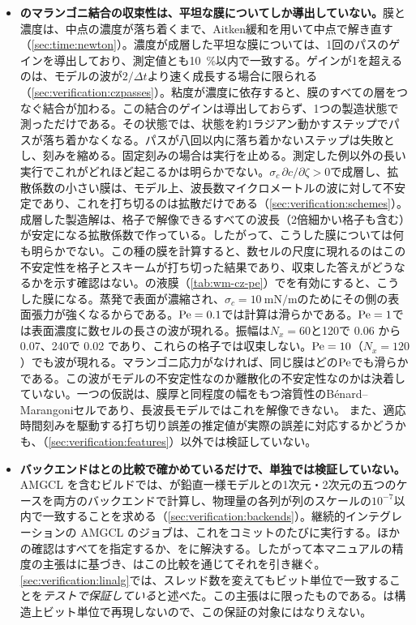 \begin{itemize}
  \item \textbf{のマランゴニ結合の収束性は、平坦な膜についてしか導出していない。}膜と濃度は、中点の濃度が落ち着くまで、Aitken緩和を用いて中点で解き直す（\cref{sec:time:newton}）。濃度が成層した平坦な膜については、1回のパスのゲインを導出しており、測定値とも\SI{10}{\percent}以内で一致する。ゲインが1を超えるのは、モデルの波が$2/\Delta t$より速く成長する場合に限られる（\cref{sec:verification:czpasses}）。粘度が濃度に依存すると、膜のすべての層をつなぐ結合が加わる。この結合のゲインは導出しておらず、1つの製造状態で測っただけである。その状態では、状態を約1ラジアン動かすステップでパスが落ち着かなくなる。パスが八回以内に落ち着かないステップは失敗とし、刻みを縮める。固定刻みの場合は実行を止める。測定した例以外の長い実行でこれがどれほど起こるかは明らかでない。$\sigma_c\,\partial c/\partial\zeta > 0$で成層し、拡散係数の小さい膜は、モデル上、波長数マイクロメートルの波に対して不安定であり、これを打ち切るのは拡散だけである（\cref{sec:verification:schemes}）。成層した製造解は、格子で解像できるすべての波長（2倍細かい格子も含む）が安定になる拡散係数で作っている。したがって、こうした膜については何も明らかでない。この種の膜を計算すると、数セルの尺度に現れるのはこの不安定性を格子とスキームが打ち切った結果であり、収束した答えがどうなるかを示す確認はない。の液膜（\cref{tab:wm-cz-pe}）でを有効にすると、こうした膜になる。蒸発で表面が濃縮され、$\sigma_c = \SI{10}{\milli\newton\per\metre}$のためにその側の表面張力が強くなるからである。$\mathrm{Pe} = 0.1$では計算は滑らかである。$\mathrm{Pe} = 1$では表面濃度に数セルの長さの波が現れる。振幅は$N_x = 60$と120で 0.06 から 0.07、240で 0.02 であり、これらの格子では収束しない。$\mathrm{Pe} = 10$（$N_x = 120$）でも波が現れる。マランゴニ応力がなければ、同じ膜はどの$\mathrm{Pe}$でも滑らかである。この波がモデルの不安定性なのか離散化の不安定性なのかは決着していない。一つの仮説は、膜厚と同程度の幅をもつ溶質性のB\'enard--Marangoniセルであり、長波長モデルではこれを解像できない。
    また、適応時間刻みを駆動する打ち切り誤差の推定値が実際の誤差に対応するかどうかも、（\cref{sec:verification:features}）以外では検証していない。
  \item \textbf{バックエンドはとの比較で確かめているだけで、単独では検証していない。}AMGCL を含むビルドでは、が鉛直一様モデルとの1次元・2次元の五つのケースを両方のバックエンドで計算し、物理量の各列が列のスケールの$10^{-7}$以内で一致することを求める（\cref{sec:verification:backends}）。継続的インテグレーションの AMGCL のジョブは、これをコミットのたびに実行する。ほかの確認はすべてを指定するか、をに解決する。したがって本マニュアルの精度の主張はに基づき、はこの比較を通じてそれを引き継ぐ。\cref{sec:verification:linalg}では、スレッド数を変えてもビット単位で一致することを\emph{テストで保証している}と述べた。この主張はに限ったものである。は構造上ビット単位で再現しないので、この保証の対象にはなりえない。

\end{itemize}
